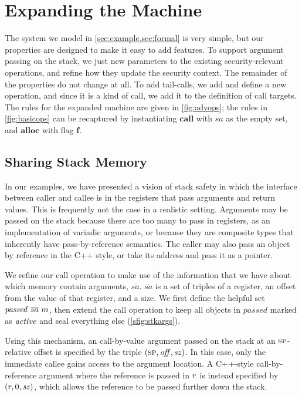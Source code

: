 \documentclass[10pt,conference]{ieeetran}%
\theoremstyle{definition}
\begin{document}
\section{Expanding the Machine}
\label{sec:extensions}

The system we model in \cref{sec:example,sec:formal} is very simple, but our properties
are designed to make it easy to add features. To support argument passing on the stack,
we just new parameters to the existing security-relevant operations, and refine how they
update the security context. The remainder of the properties do not change at all.
To add tail-calls, we add and define a new operation, and since it is a kind of call,
we add it to the definition of call targets.
The rules for the expanded machine are given in \cref{fig:advops}; the
rules in \cref{fig:basicops} can be recaptured by instantiating
\(\mathbf{call}\) with \(\overline{sa}\) as the empty set, and \(\mathbf{alloc}\)
with flag \(\mathbf{f}\).

\subsection{Sharing Stack Memory}
In our examples, we have presented a vision of stack safety in which
the interface between caller and callee is in the registers that pass
arguments and return values. This is frequently not the case in a realistic
setting. Arguments may be passed on the stack because there are too many
to pass in registers, as an implementation of variadic arguments, or
because they are composite types that inherently have
pass-by-reference semantics. The caller may also pass an object by reference
in the C++ style, or take its address and pass it as a pointer.

We refine our call operation to make use of the information that we have about
which memory contain arguments, \(\overline{sa}\). \(\overline{sa}\) is a set of
triples of a register, an offset from the value of that register, and a size.
We first define the helpful set \(\mathit{passed} ~ \overline{sa} ~ m\),
then extend the call operation to keep all objects in \(\mathit{passed}\) marked
as \(\mathit{active}\) and seal everything else (\cref{sfig:stkargs}).

Using this mechanism, an call-by-value argument passed on the stack at an \(\textsc{sp}\)-relative offset
is specified by the triple \((\textsc{sp}, \mathit{off}, \mathit{sz})\).
In this case, only the immediate callee gains access to the argument location.
A C++-style call-by-reference argument where the reference is passed in \(r\)
is instead specified by \((r, 0, \mathit{sz})\), which allows
the reference to be passed further down the stack.
\end{document}
